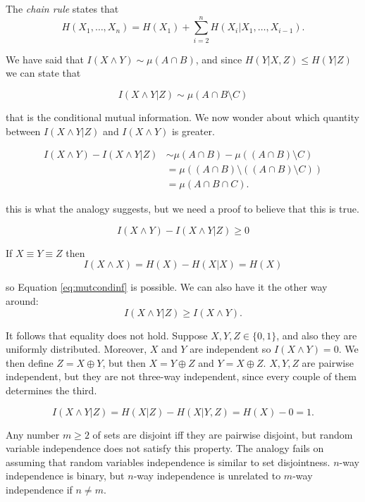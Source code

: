 \begin{prop}
The \emph{chain rule} states that
\begin{equation}
 H(X_1, \ldots, X_n) = H(X_1) + \sum_{i = 2}^n H(X_i | X_1, \ldots, X_{i-1}).
\end{equation}
\end{prop}

We have said that $I(X \wedge Y) \sim \mu(A \cap B)$, and since $H(Y | X, Z) \leq H(Y|Z)$ we can state that

\[
 I(X\wedge Y | Z) \sim \mu(A \cap B \setminus C)
\]

that is the conditional mutual information. We now wonder about which quantity between $I(X \wedge Y | Z)$ and $I(X \wedge Y)$ is greater.

\begin{align*}
 I(X \wedge Y) -  I(X\wedge Y | Z)  & \sim \mu(A \cap B) - \mu((A \cap B) \setminus C)\\
 & = \mu((A \cap B) \setminus ((A \cap B) \setminus C)) \\ 
 & = \mu(A \cap B \cap C). 
\end{align*}

this is what the analogy suggests, but we need a proof to believe that this is true.

\begin{equation}\label{eq:mutcondinf}
 I(X \wedge Y) - I(X \wedge Y | Z) \geq 0
\end{equation}

If $X \equiv Y \equiv Z$ then
\begin{equation}
I(X \wedge X) = H(X) - H(X|X) = H(X) 
\end{equation}

so Equation \ref{eq:mutcondinf} is possible. We can also have it the other way around:
\begin{equation}
I(X \wedge Y | Z) \geq I(X \wedge Y). 
\end{equation}

It follows that equality does not hold. Suppose $X, Y, Z \in \{0, 1\}$, and also they are uniformly distributed. Moreover, $X$ and $Y$ are independent so $I(X \wedge Y) = 0$. We then define $Z = X \oplus Y$, but then $X = Y \oplus Z$ and $Y = X \oplus Z$. $X, Y, Z$ are pairwise independent, but they are not three-way independent, since every couple of them determines the third.

\[
 I(X\wedge Y|Z) = H(X|Z) - H(X|Y, Z) = H(X) - 0 = 1.
\]

Any number $m \geq 2$ of sets are disjoint iff they are pairwise disjoint, but random variable independence does not satisfy this property. The analogy fails on assuming that random variables independence is similar to set disjointness. $n$-way independence is binary, but $n$-way independence is unrelated to $m$-way independence if $n \not= m$.

